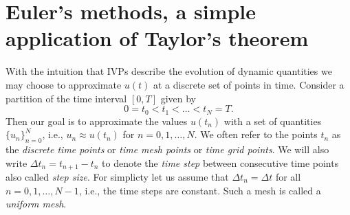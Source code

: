 \section{Euler's methods, a simple application of Taylor's theorem}
With the intuition that IVPs describe the evolution of dynamic quantities 
we may choose to approximate $u(t)$ at a discrete set of points in time. 
Consider a partition of the time interval $[0, T]$ given by
\begin{equation*}
    0 = t_0 < t_1 < \dots < t_N = T.
\end{equation*}
Then our goal is to approximate the values $u(t_n)$
with a set of quantities $\{u_n\}_{n=0}^N$, i.e.,  $u_n \approx u(t_n)$
for $n = 0, 1, \dots, N$. 
We often refer to the points 
$t_n$ as the {\it discrete time points} or {\it time mesh points}
or {\it time grid points}. 
We will also write $\Delta t_n = t_{n+1} - t_n$
to denote the {\it time step} between consecutive time points also called 
{\it step size}. For simplicty let us assume that $\Delta t_n 
= \Delta t$ for all $n = 0, 1, \dots, N-1$, i.e., the time steps are 
constant. Such a mesh is called a {\it uniform mesh}.

